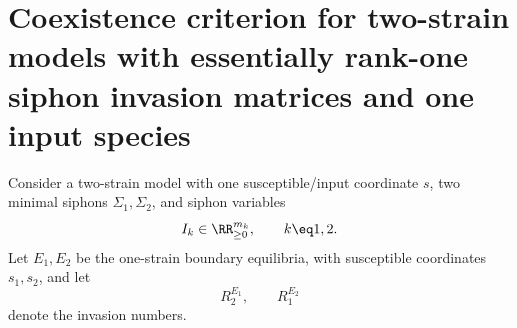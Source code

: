 \section{Coexistence criterion for two-strain models with essentially rank-one siphon invasion matrices and one
input species}

Consider a two-strain model with one susceptible/input coordinate $s$,
two minimal siphons $\Sigma_1,\Sigma_2$, and siphon variables
\[
        I_k\in\RR^{m_k}_{\ge0},
        \qquad k\eq1,2.
\]
Let $E_1,E_2$ be the one-strain boundary equilibria, with susceptible
coordinates $s_1,s_2$, and let
\[
        R_2^{E_1},
        \qquad
        R_1^{E_2}
\]
denote the invasion numbers.

